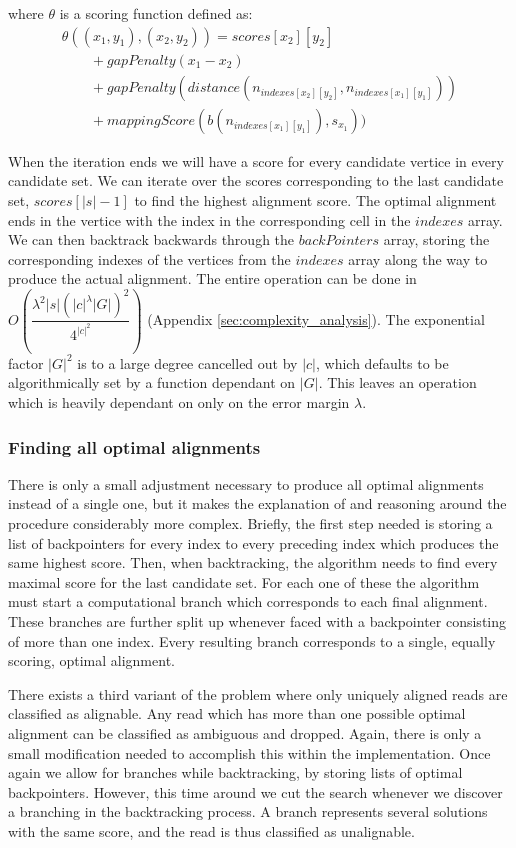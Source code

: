 \documentclass[thesis.tex]{subfiles}
\begin{document}
where $\theta$ is a scoring function defined as:\\
\begin{equation}
  \begin{array}{l}
    \theta((x_1, y_1), (x_2, y_2))=scores[x_2][y_2] \\\quad\quad + gapPenalty(x_1-x_2) \\\quad\quad + gapPenalty(distance(n_{indexes[x_2][y_2]}, n_{indexes[x_1][y_1]})) \\\quad\quad + mappingScore(b(n_{indexes[x_1][y_1]}), s_{x_1}))
  \end{array}
\end{equation}
\par\noindent
When the iteration ends we will have a score for every candidate vertice in every candidate set. We can iterate over the scores corresponding to the last candidate set, $scores[|s|-1]$ to find the highest alignment score. The optimal alignment ends in the vertice with the index in the corresponding cell in the $indexes$ array. We can then backtrack backwards through the $backPointers$ array, storing the corresponding indexes of the vertices from the $indexes$ array along the way to produce the actual alignment. The entire operation can be done in $O(\dfrac{\lambda^2|s|(|c|^{\lambda}|G|)^2}{4^{|c|^2}})$ (Appendix \ref{sec:complexity_analysis}). The exponential factor $|G|^2$ is to a large degree cancelled out by $|c|$, which defaults to be algorithmically set by a function dependant on $|G|$. This leaves an operation which is heavily dependant on only on the error margin $\lambda$.
\subsubsection{Finding all optimal alignments}
\label{sec:all_optimal_alignments}
There is only a small adjustment necessary to produce all optimal alignments instead of a single one, but it makes the explanation of and reasoning around the procedure considerably more complex. Briefly, the first step needed is storing a list of backpointers for every index to every preceding index which produces the same highest score. Then, when backtracking, the algorithm needs to find every maximal score for the last candidate set. For each one of these the algorithm must start a computational branch which corresponds to each final alignment. These branches are further split up whenever faced with a backpointer consisting of more than one index. Every resulting branch corresponds to a single, equally scoring, optimal alignment.\\
\par\noindent
There exists a third variant of the problem where only uniquely aligned reads are classified as alignable. Any read which has more than one possible optimal alignment can be classified as  ambiguous and dropped. Again, there is only a small modification needed to accomplish this within the implementation. Once again we allow for branches while backtracking, by storing lists of optimal backpointers. However, this time around we cut the search whenever we discover a branching in the backtracking process. A branch represents several solutions with the same score, and the read is thus classified as unalignable.
\end{document}
